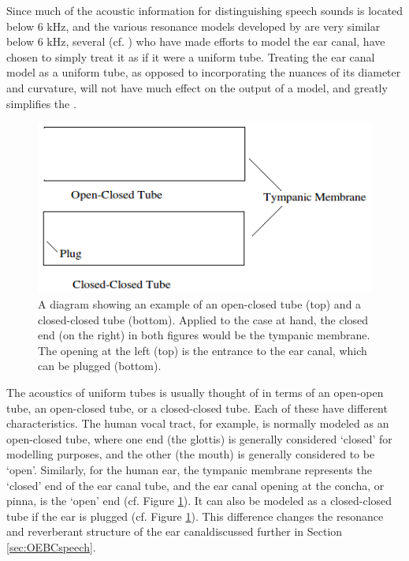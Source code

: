 Since much of the acoustic information for distinguishing speech sounds is located below 6 kHz, and the various resonance models developed by \cite{stinson:89} are very similar below 6 kHz, several (cf. \cite{stinson:89,hansen:97b,stenfelt:07}) who have made efforts to model the ear canal, have chosen to simply treat it as if it were a uniform tube.  Treating the ear canal model as a uniform tube, as opposed to incorporating the nuances of its diameter and curvature, will not have much effect on the output of a model, and greatly simplifies the \DIFdelbegin {}\DIFdelend \DIFaddbegin {}\DIFaddend .

\DIFdelbegin %
\DIFdelend \DIFaddbegin \begin{figure}[t!]
\DIFaddendFL \centering
  \includegraphics{figure/open-closed-tube.png}
  \caption{A diagram showing an example of an open-closed tube (top) and a closed-closed tube (bottom).  Applied to the case at hand, the closed end (on the right) in both figures would be the tympanic membrane.  The opening at the left (top) is the entrance to the ear canal, which can be plugged (bottom).}
  \label{fig:open-closed-tube}
\end{figure}

The acoustics of uniform tubes is usually thought of in terms of an open-open tube, an open-closed tube, or a closed-closed tube.  Each of these have different \DIFdelbegin {}\DIFdelend \DIFaddbegin {}\DIFaddend characteristics. The human vocal tract, for example, is normally modeled as an open-closed tube, where one end (the glottis) is generally considered `closed' for modelling purposes, and the other (the mouth) is generally considered to be `open'.  Similarly, for the human ear, the tympanic membrane represents the `closed' end of the ear canal tube, and the ear canal opening at the concha, or pinna, is the `open' end (cf. Figure \ref{fig:open-closed-tube}).  It can also be modeled as a closed-closed tube if the ear is plugged (cf. Figure \ref{fig:open-closed-tube}). This difference changes the resonance and reverberant structure of the ear canal\DIFdelbegin {}\DIFdelend \DIFaddbegin {}\DIFaddend discussed further in Section \ref{sec:OEBCspeech}.  

